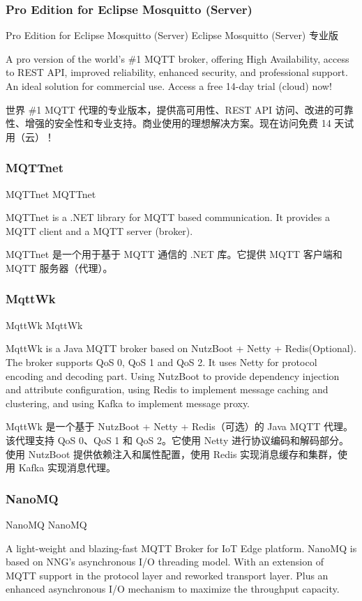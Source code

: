 \documentclass{ctexbook}
\begin{document}
\subsubsection{Pro Edition for Eclipse Mosquitto (Server)}
Pro Edition for Eclipse Mosquitto (Server) Eclipse Mosquitto (Server) 专业版

A pro version of the world's \#1 MQTT broker, offering High Availability, access to REST API, improved reliability, enhanced security, and professional support. An ideal solution for commercial use. Access a free 14-day trial (cloud) now!

世界 \#1 MQTT 代理的专业版本，提供高可用性、REST API 访问、改进的可靠性、增强的安全性和专业支持。商业使用的理想解决方案。现在访问免费 14 天试用（云）！

\subsubsection{MQTTnet}
MQTTnet MQTTnet

MQTTnet is a .NET library for MQTT based communication. It provides a MQTT client and a MQTT server (broker).

MQTTnet 是一个用于基于 MQTT 通信的 .NET 库。它提供 MQTT 客户端和 MQTT 服务器（代理）。

\subsubsection{MqttWk}
MqttWk MqttWk

MqttWk is a Java MQTT broker based on NutzBoot + Netty + Redis(Optional). The broker supports QoS 0, QoS 1 and QoS 2. It uses Netty for protocol encoding and decoding part. Using NutzBoot to provide dependency injection and attribute configuration, using Redis to implement message caching and clustering, and using Kafka to implement message proxy.

MqttWk 是一个基于 NutzBoot + Netty + Redis（可选）的 Java MQTT 代理。该代理支持 QoS 0、QoS 1 和 QoS 2。它使用 Netty 进行协议编码和解码部分。使用 NutzBoot 提供依赖注入和属性配置，使用 Redis 实现消息缓存和集群，使用 Kafka 实现消息代理。

\subsubsection{NanoMQ}
NanoMQ NanoMQ

A light-weight and blazing-fast MQTT Broker for IoT Edge platform. NanoMQ is based on NNG's asynchronous I/O threading model. With an extension of MQTT support in the protocol layer and reworked transport layer. Plus an enhanced asynchronous I/O mechanism to maximize the throughput capacity.
\end{document}
